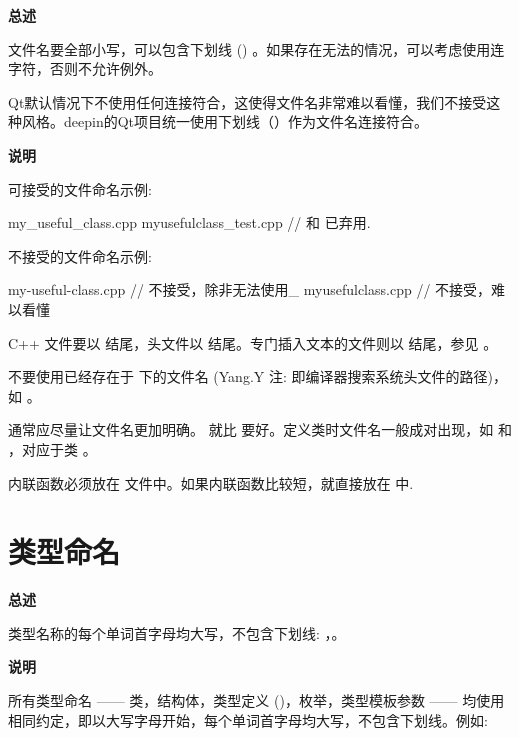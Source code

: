 \textbf{总述}

文件名要全部小写，可以包含下划线 (\cppinline{_}) 。如果存在无法\cppinline{_}的情况，可以考虑使用连字符\cppinline{-}，否则不允许例外。

\begin{DWarn}
  Qt默认情况下不使用任何连接符合，这使得文件名非常难以看懂，我们不接受这种风格。deepin的Qt项目统一使用下划线（\cppinline{_}）作为文件名连接符合。
\end{DWarn}

\textbf{说明}

可接受的文件命名示例:

\begin{cppcode}
  my_useful_class.cpp
  myusefulclass_test.cpp //  和  已弃用.
\end{cppcode}

不接受的文件命名示例:

\begin{cppcode}
  my-useful-class.cpp  // 不接受，除非无法使用_
  myusefulclass.cpp    // 不接受，难以看懂
\end{cppcode}

C++ 文件要以  结尾，头文件以  结尾。专门插入文本的文件则以  结尾，参见 。

不要使用已经存在于  下的文件名 (Yang.Y 注: 即编译器搜索系统头文件的路径)，如 。

通常应尽量让文件名更加明确。 就比  要好。定义类时文件名一般成对出现，如  和 ，对应于类 。

内联函数必须放在  文件中。如果内联函数比较短，就直接放在  中.

\section{类型命名} \label{type-names}

\textbf{总述}

类型名称的每个单词首字母均大写，不包含下划线: ，。

\textbf{说明}

所有类型命名 —— 类，结构体，类型定义 ()，枚举，类型模板参数 —— 均使用相同约定，即以大写字母开始，每个单词首字母均大写，不包含下划线。例如:

